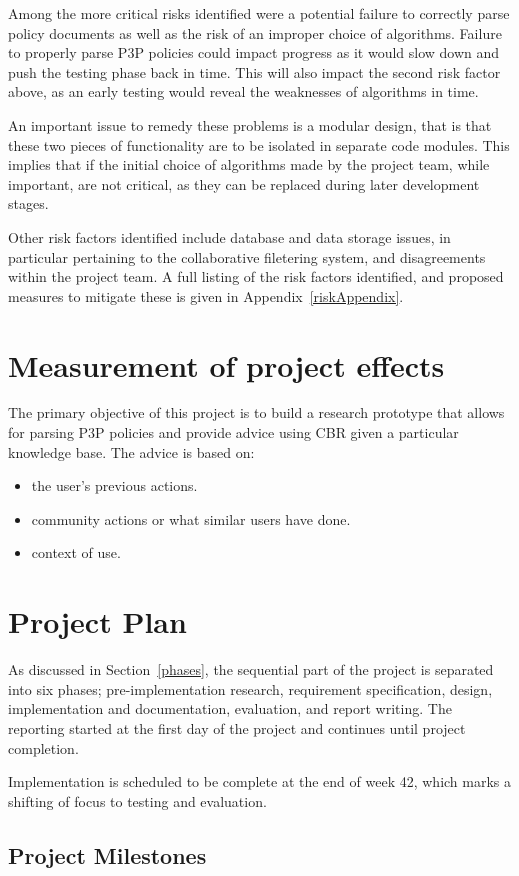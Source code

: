 Among the more critical risks identified were a potential failure to
correctly parse policy documents as well as the risk of an improper
choice of algorithms. Failure to properly parse P3P policies could
impact progress as it would slow down and push the testing phase back
in time. This will also impact the second risk factor above, as an
early testing would reveal the weaknesses of algorithms in time.

An important issue to remedy these problems is a modular design, that
is that these two pieces of functionality are to be isolated in
separate code modules. This implies that if the initial choice of algorithms
made by the project team, while important, are not critical, as they
can be replaced during later development stages.

Other risk factors identified include database and data storage
issues, in particular pertaining to the collaborative filetering
system, and disagreements within the project team. A full listing
of the risk factors identified, and proposed measures to mitigate
these is given in Appendix~\ref{riskAppendix}.


\section{Measurement of project effects}
The primary objective of this project is to build a research prototype that allows for parsing P3P policies and provide advice using CBR given a particular knowledge base. The advice is based on: 

\begin{itemize}
\item the user's previous actions.
\item community actions or what similar users have done.
\item context of use.
\end{itemize}
   

\section{Project Plan}
As discussed in Section~\ref{phases}, the sequential part of the project is separated into six phases; pre-implementation research, requirement specification, design, implementation and documentation, evaluation, and report writing. The reporting started at the first day of the project and continues until project completion. 

Implementation is scheduled to be complete at the end of week 42, which marks a shifting of focus to testing and evaluation. 

\subsection{Project Milestones}

